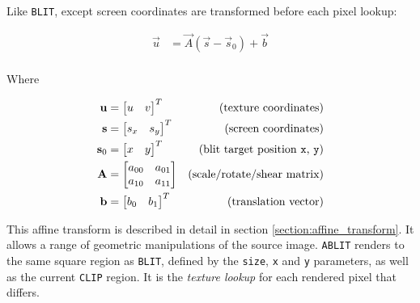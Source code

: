 Like {\tt BLIT}, except screen coordinates are transformed before each pixel lookup:

\begin{align*}
\vec{u}   &= \vec{A}(\vec{s} - \vec{s}_0) + \vec{b} \\
\end{align*}

Where

\begin{align*}
\vec{u}   &= \begin{bmatrix}u & v \\ \end{bmatrix}^T & \textup{(texture coordinates)} \\
\vec{s}   &= \begin{bmatrix}s_x & s_y \\ \end{bmatrix}^T & \textup{(screen coordinates)} \\
\vec{s}_0 &= \begin{bmatrix}x & y \\ \end{bmatrix}^T & \textup{(blit target position {\tt x}, {\tt y})} \\
\vec{A}   &= \begin{bmatrix}a_{00} & a_{01} \\ a_{10} & a_{11} \end{bmatrix} & \textup{(scale/rotate/shear matrix)} \\
\vec{b}   &= \begin{bmatrix}b_0 & b_1 \\ \end{bmatrix}^T & \textup{(translation vector)} \\
\end{align*}

This affine transform is described in detail in section \ref{section:affine_transform}. It allows a range of geometric manipulations of the source image. {\tt ABLIT} renders to the same square region as {\tt BLIT}, defined by the {\tt size}, {\tt x} and {\tt y} parameters, as well as the current {\tt CLIP} region. It is the {\it texture lookup} for each rendered pixel that differs.

